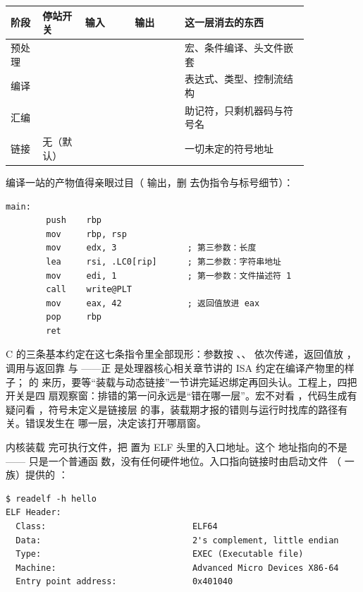 \begin{longtable}{L{0.09\linewidth}L{0.12\linewidth}L{0.14\linewidth}L{0.14\linewidth}L{0.35\linewidth}}
\toprule
阶段 & 停站开关 & 输入 & 输出 & 这一层消去的东西 \\
\midrule
预处理 &  &  &  & 宏、条件编译、头文件嵌套 \\\tablerowrule
编译 &  &  &  & 表达式、类型、控制流结构 \\\tablerowrule
汇编 &  &  &  & 助记符，只剩机器码与符号名 \\\tablerowrule
链接 & 无（默认） &  &  & 一切未定的符号地址 \\
\bottomrule
\end{longtable}

编译一站的产物值得亲眼过目（ 输出，删
去伪指令与标号细节）：

\begin{lstlisting}
main:
        push    rbp
        mov     rbp, rsp
        mov     edx, 3              ; 第三参数：长度
        lea     rsi, .LC0[rip]      ; 第二参数：字符串地址
        mov     edi, 1              ; 第一参数：文件描述符 1
        call    write@PLT
        mov     eax, 42             ; 返回值放进 eax
        pop     rbp
        ret
\end{lstlisting}

C 的三条基本约定在这七条指令里全部现形：参数按
、、 依次传递，返回值放
，调用与返回靠  与 ——正
是处理器核心相关章节讲的 ISA 约定在编译产物里的样子； 的
来历，要等“装载与动态链接”一节讲完延迟绑定再回头认。工程上，四把开关是四
扇观察窗：排错的第一问永远是“错在哪一层”。宏不对看
，代码生成有疑问看 ，符号未定义是链接层
的事，装载期才报的错则与运行时找库的路径有关。错误发生在
哪一层，决定该打开哪扇窗。

内核装载
完可执行文件，把  置为 ELF 头里的入口地址。这个
地址指向的不是 —— 只是一个普通函
数，没有任何硬件地位。入口指向链接时由启动文件
（ 一族）提供的 ：

\begin{lstlisting}
$ readelf -h hello
ELF Header:
  Class:                             ELF64
  Data:                              2's complement, little endian
  Type:                              EXEC (Executable file)
  Machine:                           Advanced Micro Devices X86-64
  Entry point address:               0x401040
\end{lstlisting}

